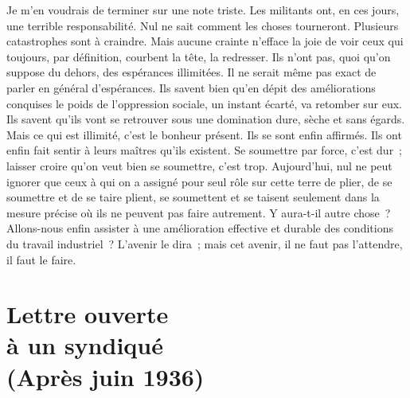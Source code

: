 \documentclass[french,twoside]{book} %
\begin{document}
Je m'en voudrais de terminer sur une note triste. Les militants ont, en ces jours, une terrible responsabilité. Nul ne sait comment les choses tourneront. Plusieurs catastrophes sont à craindre. Mais aucune crainte n'efface la joie de voir ceux qui toujours, par définition, courbent la tête, la redresser. Ils n'ont pas, quoi qu'on suppose du dehors, des espérances illimitées. Il ne serait même pas exact de parler en général d'espérances. Ils savent bien qu'en dépit des améliorations conquises le poids de l'oppression sociale, un instant écarté, va retomber sur eux. Ils savent qu'ils vont se retrouver sous une domination dure, sèche et sans égards. Mais ce qui est illimité, c'est le bonheur présent. Ils se sont enfin affirmés. Ils ont enfin fait sentir à leurs maîtres qu'ils existent. Se soumettre par force, c'est dur ; laisser croire qu'on veut bien se soumettre, c'est trop. Aujourd'hui, nul ne peut ignorer que ceux à qui on a assigné pour seul rôle sur cette terre de plier, de se soumettre et de se taire plient, se soumettent et se taisent seulement dans la mesure précise où ils ne peuvent pas faire autrement. Y aura-t-il autre chose ? Allons-nous enfin assister à une amélioration effective et durable des conditions du travail industriel ? L'avenir le dira ; mais cet avenir, il ne faut pas l'attendre, il faut le faire.
\section[Lettre ouverte, à un syndiqué, (Après juin 1936)]{Lettre ouverte \\
à un syndiqué \\
(Après juin 1936)}\renewcommand{\leftmark}{Lettre ouverte \\
à un syndiqué \\
(Après juin 1936)}
\end{document}
